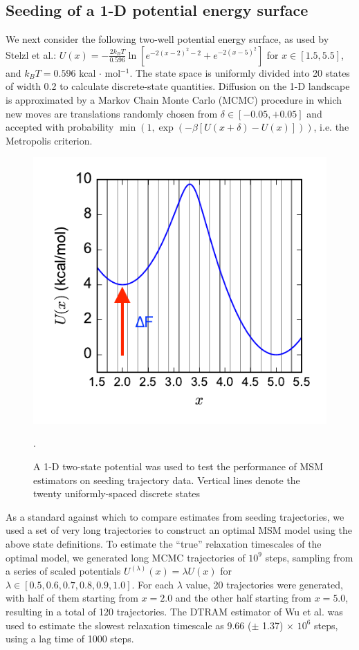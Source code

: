 \documentclass[%
 aip,
rsi,%
 amsmath,amssymb,
 reprint,%
]{revtex4-1}
\begin{document}
\subsection*{Seeding of a 1-D potential energy surface}

We next consider the following two-well potential energy surface, as used by Stelzl et al.\cite{Stelzl:2017gra}:  $U(x) = -\frac{2k_BT}{0.596} \ln [ e^{-2(x-2)^2-2} + e^{-2(x-5)^2} ] $
for $x \in [1.5,5.5]$, and $k_BT = 0.596$ kcal $\cdot$ mol$^{-1}$.  The state space is uniformly divided into 20 states of width 0.2 to calculate discrete-state quantities. Diffusion on the 1-D landscape is approximated by a Markov Chain Monte Carlo (MCMC) procedure in which new moves are translations randomly chosen from $\delta \in [-0.05, +0.05]$ and accepted with probability $\min(1, \exp( -\beta [U(x+\delta)-U(x)]))$, i.e. the Metropolis criterion.

\begin{figure}[ht!]
    \includegraphics[width=0.9\columnwidth]{figures/1D-potential-v2.pdf}
    \caption{A 1-D two-state potential was used to test the performance of MSM estimators on seeding trajectory data.  Vertical lines denote the twenty uniformly-spaced discrete states}.
    \label{fig:1D-potential-v2}
\end{figure}

As a standard against which to compare estimates from seeding trajectories, we used a set of very long trajectories to construct an optimal MSM model using the above state definitions.   To estimate the  ``true'' relaxation timescales of the optimal model, we generated long MCMC trajectories of $10^9$ steps, sampling from a series of scaled potentials $U^{(\lambda)}(x) = \lambda U(x)$ for $\lambda \in [0.5, 0.6, 0.7, 0.8, 0.9, 1.0]$. For each $\lambda$ value, 20 trajectories were generated, with half of them starting from $x=2.0$ and the other half starting from $x=5.0$, resulting in a total of 120 trajectories.  The DTRAM estimator of Wu et al.\cite{Wu:2014jy} was used to estimate the slowest relaxation timescale as 9.66 ($\pm$ 1.37) $\times$ $10^6$ steps, using a lag time of 1000 steps.
\end{document}
